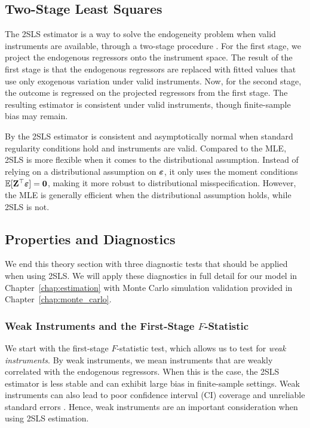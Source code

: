 \subsection{Two-Stage Least Squares}

The 2SLS estimator is a way to solve the endogeneity problem when valid instruments are available, through a two-stage procedure \parencite[Eq.~(4.1.9), p.~122]{Angrist2009}. For the first stage, we project the endogenous regressors onto the instrument space. The result of the first stage is that the endogenous regressors are replaced with fitted values that use only exogenous variation under valid instruments. Now, for the second stage, the outcome is regressed on the projected regressors from the first stage. The resulting estimator is consistent under valid instruments, though finite-sample bias may remain.

By \textcite[Sec.~4.2.1]{Angrist2009} the 2SLS estimator is consistent and asymptotically normal when standard regularity conditions hold and instruments are valid. Compared to the MLE, 2SLS is more flexible when it comes to the distributional assumption. Instead of relying on a distributional assumption on $\bm{\varepsilon}$, it only uses the moment conditions $\mathbb{E}[\mathbf{Z}^\top\bm{\varepsilon}] = \bm{0}$, making it more robust to distributional misspecification. However, the MLE is generally efficient when the distributional assumption holds, while 2SLS is not.

\subsection{Properties and Diagnostics}
\label{sec:bg:iv_diagnostics}
We end this theory section with three diagnostic tests that should be applied when using 2SLS\@. We will apply these diagnostics in full detail for our model in Chapter~\ref{chap:estimation} with Monte Carlo simulation validation provided in Chapter~\ref{chap:monte_carlo}.

\subsubsection{Weak Instruments and the First-Stage $F$-Statistic}

We start with the first-stage $F$-statistic test, which allows us to test for \emph{weak instruments}. By weak instruments, we mean instruments that are weakly correlated with the endogenous regressors. When this is the case, the 2SLS estimator is less stable and can exhibit large bias in finite-sample settings. Weak instruments can also lead to poor confidence interval (CI) coverage and unreliable standard errors \parencite[p.~557]{Staiger1997}. Hence, weak instruments are an important consideration when using 2SLS estimation.

